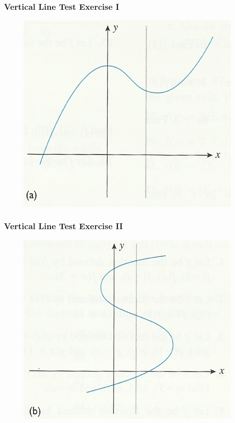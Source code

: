 \documentclass[xcolor=dvipsnames]{beamer}
\begin{document}
\begin{frame}
  \frametitle{Vertical Line Test Exercise I}
  \begin{figure}[h]
    \includegraphics[scale=1]{./diagrams/vertical-01.png}
  \end{figure}
\end{frame}

\begin{frame}
  \frametitle{Vertical Line Test Exercise II}
  \begin{figure}[h]
    \includegraphics[scale=1]{./diagrams/vertical-02.png}
  \end{figure}
\end{frame}
\end{document}
